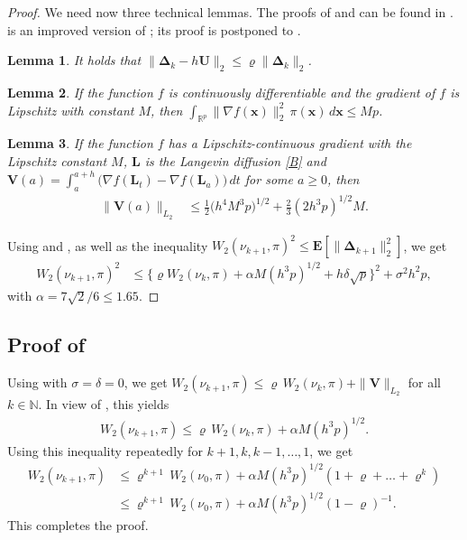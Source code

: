 \documentclass[aoap,preprint,reqno,a4paper]{imsart} %
\newcommand{\RR}{\mathbb{R}}
\newcommand{\NN}{\mathbb{N}}
\newcommand{\bDelta}{\boldsymbol{\Delta}}
\newcommand{\bfE}{\mathbf E}
\newcommand{\bU}{\boldsymbol U}
\newcommand{\bV}{\boldsymbol V}
\newcommand{\bL}{\boldsymbol L}
\newcommand{\bx}{\boldsymbol x}
\newtheorem{lemma}{Lemma}
\begin{document}
\begin{proof}
We need now three technical lemmas. The proofs of  and  can be found in \citep{DalalyanColt}.
 is an improved version of \citep[Lemma 3]{DalalyanColt};  its proof is postponed to .

\begin{lemma}\label{lemA}
It holds that $\|\bDelta_k  -h \bU\|_2 \le  \varrho\|\bDelta_k\|_2$.
\end{lemma}

\begin{lemma}\label{lemB}
If the function $f$ is continuously differentiable and the gradient of $f$ is Lipschitz
with constant $M$, then  $\int_{\RR^p} \|\nabla f(\bx)\|_2^2\,\pi(\bx)\,d\bx \le Mp$.
\end{lemma}

\begin{lemma}\label{lemC}
If the function $f$ has a Lipschitz-continuous gradient with the Lipschitz constant $M$,
$\bL$ is the Langevin diffusion \eqref{B} and $\bV(a) =
\int_a^{a+h}\big(\nabla f(\bL_t)-\nabla f(\bL_a)\big)\,dt$ for some $a\ge 0$, then
\begin{align}		
\|\bV(a)\|_{L_2}	&\le \frac12\big(h^4 M^{3}p\big)^{1/2} + \frac23(2h^3p)^{1/2}M .
\end{align}
\end{lemma}

Using  and , as well as the inequality $W_2(\nu_{k+1},\pi)^2\le
\bfE[\|\bDelta_{k+1} \|_2^2]$, we get
\begin{align}
W_2(\nu_{k+1},\pi)^2
		&\le \big\{\varrho W_2(\nu_{k},\pi) +\alpha M(h^3p)^{1/2} + h\delta\sqrt{p}\big\}^2
		+ \sigma^2 h^2 p,\label{DD}
\end{align}
with $\alpha = 7\sqrt{2}/6\le 1.65$.
\end{proof}

\subsection{Proof of }

Using  with $\sigma=\delta =0$, we get
$W_2(\nu_{k+1},\pi)\le \varrho\, W_2(\nu_{k},\pi) + \|\bV\|_{L_2}$ for all $k\in\NN$.
In view of , this yields
\begin{align}
W_2(\nu_{k+1},\pi)
		\le \varrho\, W_2(\nu_{k},\pi) + \alpha M (h^3 p)^{1/2}.
\end{align}
Using this inequality repeatedly for $k+1,k,k-1,\ldots,1$, we get
\begin{align}
W_2(\nu_{k+1},\pi)
		&\le \varrho^{k+1}\, W_2(\nu_{0},\pi) + \alpha M (h^3 p)^{1/2}(1+\varrho+\ldots+\varrho^k)\\
		&\le \varrho^{k+1}\, W_2(\nu_{0},\pi) + \alpha M (h^3 p)^{1/2}(1-\varrho)^{-1}.
\end{align}
This completes the proof.
\end{document}
